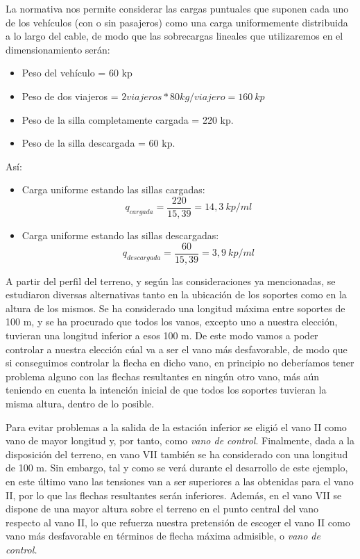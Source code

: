 \documentclass[a4paper,11pt]{article}
\begin{document}
\par La normativa nos permite considerar las cargas puntuales que suponen cada uno de los vehículos (con o sin pasajeros) como una carga uniformemente distribuida a lo largo del cable, de modo que las sobrecargas lineales que utilizaremos en el dimensionamiento serán:\\
\begin{itemize}
\item Peso del vehículo = 60 kp
\item Peso de dos viajeros = $2 viajeros * 80 kg/viajero = 160~kp$
\item Peso de la silla completamente cargada = 220 kp.
\item Peso de la silla descargada = 60 kp.
\end{itemize}
Así:
\begin{itemize}
\item Carga uniforme estando las sillas cargadas:
\begin{displaymath}
q_{cargada} = \frac{220}{15,39} = 14,3~kp/ml 
\end{displaymath}
\item Carga uniforme estando las sillas descargadas:
\begin{displaymath}
q_{descargada} = \frac{60}{15,39} = 3,9~kp/ml 
\end{displaymath}
\end{itemize}
\par A partir del perfil del terreno, y según las consideraciones ya mencionadas, se estudiaron diversas alternativas tanto en la ubicación de los soportes como en la altura de los mismos. Se ha considerado una longitud máxima entre soportes de 100 m, y se ha procurado que todos los vanos, excepto uno a nuestra elección, tuvieran una longitud inferior a esos 100 m. De este modo vamos a poder controlar a nuestra elección cúal va a ser el vano más desfavorable, de modo que si conseguimos controlar la flecha en dicho vano, en principio no deberíamos tener problema alguno con las flechas resultantes en ningún otro vano, más aún teniendo en cuenta la intención inicial de que todos los soportes tuvieran la misma altura, dentro de lo posible.\\
\par Para evitar problemas a la salida de la estación inferior se eligió el vano II como vano de mayor longitud y, por tanto, como {\em vano de control}. Finalmente, dada a la disposición del terreno, en vano VII también se ha considerado con una longitud de 100 m. Sin embargo, tal y como se verá durante el desarrollo de este ejemplo, en este último vano las tensiones van a ser superiores a las obtenidas para el vano II, por lo que las flechas resultantes serán inferiores. Además, en el vano VII se dispone de una mayor altura sobre el terreno en el punto central del vano respecto al vano II, lo que refuerza nuestra pretensión de escoger el vano II como vano más desfavorable en términos de flecha máxima admisible, o {\em vano de control.}\\
\end{document}
